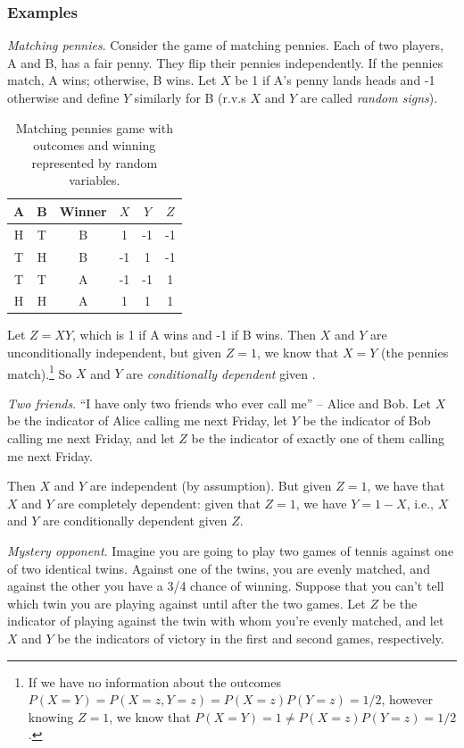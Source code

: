 \clearpage
\subsubsection{Examples}

\emph{Matching pennies}. 
Consider the game of matching pennies. 
Each of two players, A and B, has a fair penny. 
They flip their pennies independently. 
If the pennies match, A wins; otherwise, B wins. 
Let \(X\) be 1 if A's penny lands heads and -1 otherwise 
and define \(Y\) similarly for B (r.v.s \(X\) and \(Y\) are called \emph{random signs}).

\begin{table}[h!]
\centering
\begin{tabular}{| c | c | c | c | c | c |}
\hline
A & B & Winner & \(X\) & \(Y\) & \(Z\) \\\hline
H & T & B & 1 & -1 & -1 \\\hline
T & H & B & -1 & 1 & -1 \\\hline
T & T & A & -1 & -1 & 1 \\\hline
H & H & A & 1 & 1 & 1 \\\hline
\end{tabular}
\caption{%
Matching pennies game with outcomes and winning represented by random variables.
}
\end{table}

Let \(Z = XY\), which is 1 if A wins and -1 if B wins. Then \(X\) and
\(Y\) are unconditionally independent, but given \(Z = 1\), we know that
\(X = Y\) (the pennies match).\footnote{If we have no information about
  the outcomes \(P(X = Y) = P(X = z,Y = z) = P(X = z)P(Y = z) = 1/2\),
  however knowing \(Z = 1\), we know that
  \(P(X = Y) = 1 \neq P(X = z)P(Y = z) = 1/2\).} So \(X\) and \(Y\) are
\emph{conditionally dependent} given \(\).

\emph{Two friends}. ``I have only two friends who ever call me'' 
-- Alice and Bob. 
Let \(X\) be the indicator of Alice calling me next Friday, 
let \(Y\) be the indicator of Bob calling me next Friday, 
and let \(Z\) be the indicator of exactly one of them calling me next Friday.

Then \(X\) and \(Y\) are independent (by assumption). 
But given \(Z = 1\), 
we have that \(X\) and \(Y\) are completely dependent:
given that \(Z = 1\), 
we have \(Y = 1 - X\), i.e., \(X\) and \(Y\) are conditionally dependent given \(Z\).

\emph{Mystery opponent}. 
Imagine you are going to play two games of tennis against one of two identical twins. 
Against one of the twins, you are evenly matched, 
and against the other you have a 3/4 chance of winning. 
Suppose that you can't tell which twin you are playing against until after the two games. 
Let \(Z\) be the indicator of playing against the twin 
with whom you're evenly matched, 
and let \(X\) and \(Y\) be the indicators of victory in the first and second games, respectively.


